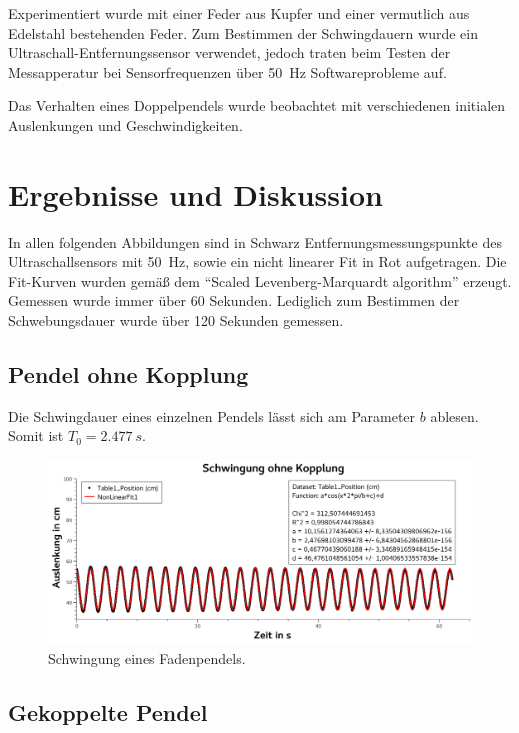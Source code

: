\documentclass[
	a4paper,
	12pt,
	pagesize,
	ngerman
]{scrartcl}
\begin{document}
	Experimentiert wurde mit einer Feder aus Kupfer und einer vermutlich aus Edelstahl bestehenden Feder.
	Zum Bestimmen der Schwingdauern wurde ein Ultraschall-Entfernungssensor verwendet, jedoch traten beim Testen der Messapperatur bei Sensorfrequenzen über \SI{50}{Hz} Softwareprobleme auf.

	Das Verhalten eines Doppelpendels wurde beobachtet mit verschiedenen initialen Auslenkungen und Geschwindigkeiten. 
	

	\section{Ergebnisse und Diskussion}
	In allen folgenden Abbildungen sind in Schwarz Entfernungsmessungspunkte des Ultraschallsensors mit \SI{50}{Hz}, sowie ein nicht linearer Fit in Rot aufgetragen.  Die Fit-Kurven wurden gemäß dem \enquote{Scaled Levenberg-Marquardt algorithm} erzeugt. Gemessen wurde immer über \SI{60}{} Sekunden. Lediglich zum Bestimmen der Schwebungsdauer wurde über \SI{120}{} Sekunden gemessen. %
	\subsection{Pendel ohne Kopplung}
	Die Schwingdauer eines einzelnen Pendels lässt sich am Parameter $b$ ablesen. Somit ist $T_0 =  \SI{2,477}{s}$.

	\begin{figure}[H]
		\includegraphics[width=1\textwidth]{SchwingungOhneKopplung}
		\centering
		\caption{Schwingung eines Fadenpendels.}
		\label{SchwingungOhneKopplung}
		\centering
	\end{figure}

	\subsection{Gekoppelte Pendel}
\end{document}
